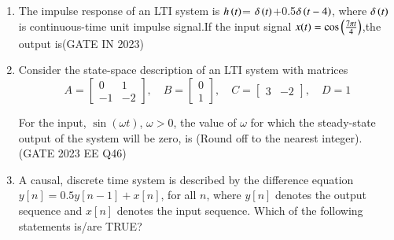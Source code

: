 \begin{enumerate}[label=\thechapter.\arabic*,ref=\thechapter.\theenumi]
\begin{enumerate}
\item {} \textrightarrow {}   ,   \textrightarrow {}   ,    \textrightarrow {}   ,    \textrightarrow {}

\item  {} \textrightarrow {}   ,    \textrightarrow {}   ,    \textrightarrow {}   ,    \textrightarrow {}

\item {} \textrightarrow {}   ,   \textrightarrow {}    ,    \textrightarrow {}   ,   \textrightarrow {}

\end{enumerate}
\solution
\newpage


\item
The impulse response of an LTI system is $h\left(t\right)$= $\delta\left(t\right)$+0.5$ \delta\left(t-4\right)$, where $\delta\left(t\right)$ is continuous-time unit impulse signal.If the input signal $x(t)=\cos\left(\frac{7\pi t}{4}\right)$,the output is\hfill(GATE IN 2023)\\
\solution 

\newpage

\newpage

\item Consider the state-space description of an LTI system with matrices
\[ 
A = \begin{bmatrix} 0 & 1 \\ -1 & -2 \end{bmatrix}, \quad 
B = \begin{bmatrix} 0 \\ 1 \end{bmatrix}, \quad 
C = \begin{bmatrix} 3 & -2 \end{bmatrix}, \quad 
D = 1 
\]

For the input, $\sin(\omega t)$, $\omega > 0$, the value of $\omega$ for which the steady-state output of the system will be zero, is \underline{\hspace{2cm}} (Round off to the nearest integer).
\hfill(GATE 2023 EE Q46)\\
\solution

\newpage

\item A causal, discrete time system is described by the difference equation $y[n] = 0.5 y[n-1] + x[n]$, for all $n$, where $y[n]$ denotes the output sequence and $x[n]$ denotes the input sequence. Which of the following statements is/are TRUE?


\end{enumerate}
